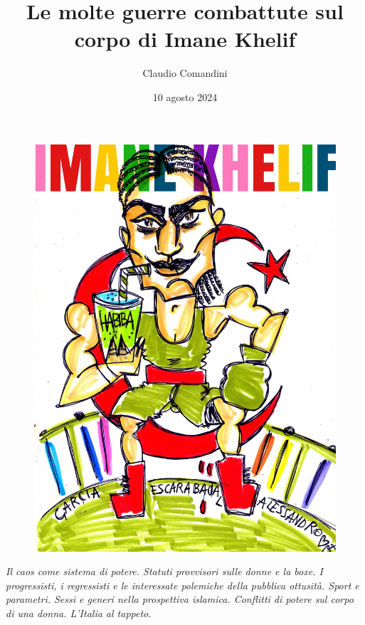 \documentclass[
  letterpaper,
  DIV=11,
  numbers=noendperiod]{scrartcl}
\title{Le molte guerre combattute sul corpo di Imane Khelif}
\author{Claudio Comandini}
\date{10 agosto 2024}
\begin{document}
\maketitle
\ifdefined\Shaded\renewenvironment{Shaded}{\begin{tcolorbox}[sharp corners, enhanced, borderline west={3pt}{0pt}{shadecolor}, interior hidden, frame hidden, breakable, boxrule=0pt]}{\end{tcolorbox}}\fi

\begin{figure}

{\centering \includegraphics{images/Imane_Khelif.jpg}

}

\end{figure}

\emph{Il caos come sistema di potere. Statuti provvisori sulle donne e
la boxe. I progressisti, i regressisti e le interessate polemiche della
pubblica ottusità. Sport e parametri. Sessi e generi nella prospettiva
islamica. Conflitti di potere sul corpo di una donna. L'Italia al
tappeto.}
\end{document}
